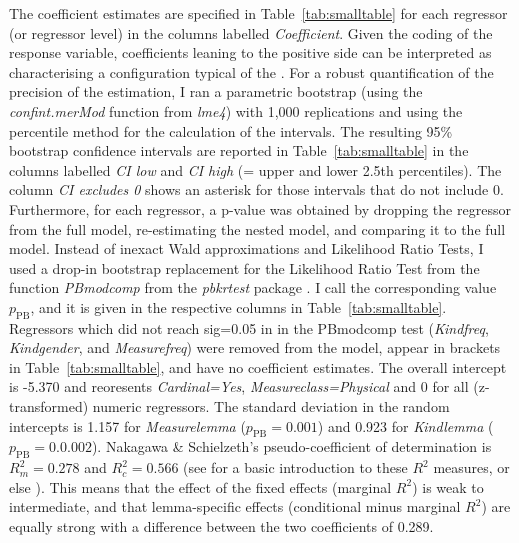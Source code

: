 The coefficient estimates are specified in Table~\ref{tab:smalltable} for each regressor (or regressor level) in the columns labelled \textit{Coefficient}.
Given the coding of the response variable, coefficients leaning to the positive side can be interpreted as characterising a configuration typical of the \PGCd.
For a robust quantification of the precision of the estimation, I ran a parametric bootstrap (using the \mbox{\textit{confint.merMod}} function from \textit{lme4}) with 1,000 replications and using the percentile method for the calculation of the intervals.
The resulting 95\% bootstrap confidence intervals are reported in Table~\ref{tab:smalltable} in the columns labelled \textit{CI low} and \textit{CI high} (= upper and lower 2.5th percentiles).
The column \textit{CI excludes 0} shows an asterisk for those intervals that do not include 0.
Furthermore, for each regressor, a p-value was obtained by dropping the regressor from the full model, re-estimating the nested model, and comparing it to the full model.
Instead of inexact Wald approximations and Likelihood Ratio Tests, I used a drop-in bootstrap replacement for the Likelihood Ratio Test from the function \textit{PBmodcomp} from the \textit{pbkrtest} package \citep{HalekohHojsgaard2014}.
I call the corresponding value $p_{\text{PB}}$, and it is given in the respective columns in Table~\ref{tab:smalltable}.
Regressors which did not reach sig=0.05 in in the PBmodcomp test (\textit{Kindfreq}, \textit{Kindgender}, and \textit{Measurefreq}) were removed from the model, appear in brackets in Table~\ref{tab:smalltable}, and have no coefficient estimates.
The overall intercept is -5.370 and reoresents \textit{Cardinal=Yes}, \textit{Measureclass=Physical} and 0 for all (z-transformed) numeric regressors.
The standard deviation in the random intercepts is 1.157 for \textit{Measurelemma} ($p_{\text{PB}}=0.001$) and 0.923 for \textit{Kindlemma} ($p_{\text{PB}}=0.0.002$).
Nakagawa \& Schielzeth's pseudo-coefficient of determination is $R_m^2=0.278$ and $R^2_c=0.566$ (see \citealp{Gries2015} for a basic introduction to these $R^2$ measures, or else \citealp{NakagawaSchielzeth2013}).
This means that the effect of the fixed effects (marginal $R^2$) is weak to intermediate, and that lemma-specific effects (conditional minus marginal $R^2$) are equally strong with a difference between the two coefficients of 0.289.

